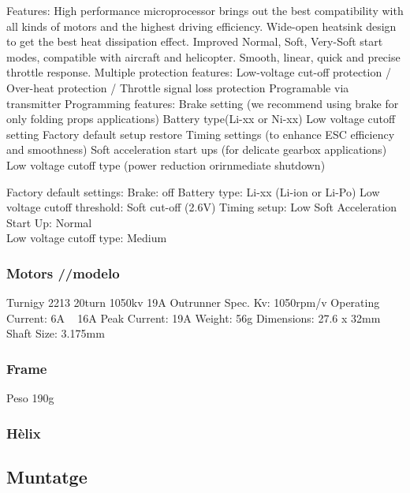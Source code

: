 \documentclass[twoside]{article}
\begin{document}
Features:
High performance microprocessor brings out the best compatibility with all kinds of motors and the highest driving efficiency.
Wide-open heatsink design to get the best heat dissipation effect.
Improved Normal, Soft, Very-Soft start modes, compatible with aircraft and helicopter. 
Smooth, linear, quick and precise throttle response.
Multiple protection features: Low-voltage cut-off protection / Over-heat protection / Throttle signal loss protection
Programable via transmitter
Programming features:
Brake setting (we recommend using brake for only folding props applications)
Battery type(Li-xx or Ni-xx) 
Low voltage cutoff setting 
Factory default setup restore 
Timing settings (to enhance ESC efficiency and smoothness) 
Soft acceleration start ups (for delicate gearbox applications)
Low voltage cutoff type (power reduction orirnmediate shutdown)
 
Factory default settings:
Brake:  off 
Battery type:  Li-xx (Li-ion or Li-Po) 
Low voltage cutoff threshold:  Soft cut-off (2.6V) 
Timing setup:  Low 
Soft Acceleration Start Up:  Normal \\
Low voltage cutoff type:  Medium

\subsubsection*{Motors //modelo}
Turnigy 2213 20turn 1050kv 19A Outrunner
Spec.
Kv: 1050rpm/v
Operating Current: 6A ~ 16A
Peak Current: 19A
Weight: 56g
Dimensions: 27.6 x 32mm
Shaft Size: 3.175mm

\subsubsection*{Frame}
Peso 190g

\subsubsection*{Hèlix}


\newpage
\subsection{Muntatge}
\end{document}
